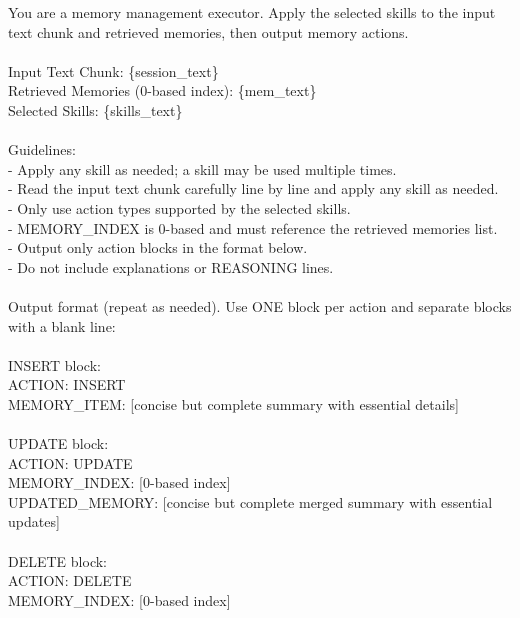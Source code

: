 \begin{center}
\begin{tcolorbox}[title={Executor Prompt}]
{
You are a memory management executor. Apply the selected skills to the input text chunk and retrieved memories, then output memory actions. \\\\
Input Text Chunk: \{session\_text\} \\
Retrieved Memories (0-based index): \{mem\_text\} \\
Selected Skills: \{skills\_text\} \\\\
Guidelines: \\
- Apply any skill as needed; a skill may be used multiple times. \\
- Read the input text chunk carefully line by line and apply any skill as needed. \\
- Only use action types supported by the selected skills. \\
- MEMORY\_INDEX is 0-based and must reference the retrieved memories list. \\
- Output only action blocks in the format below. \\
- Do not include explanations or REASONING lines. \\\\
Output format (repeat as needed). Use ONE block per action and separate blocks with a blank line: \\\\
INSERT block: \\
ACTION: INSERT \\
MEMORY\_ITEM: [concise but complete summary with essential details] \\\\
UPDATE block: \\
ACTION: UPDATE \\
MEMORY\_INDEX: [0-based index] \\
UPDATED\_MEMORY: [concise but complete merged summary with essential updates] \\\\
DELETE block: \\
ACTION: DELETE \\
MEMORY\_INDEX: [0-based index]
}
\label{appendix:case_executor}
\end{tcolorbox}
\end{center}





